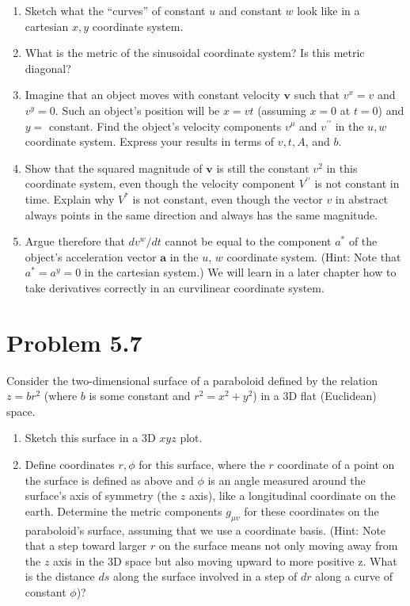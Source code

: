 \documentclass[12pt]{article}
\begin{document}
\begin{enumerate}
      \item Sketch what the ``curves'' of constant \(u\) and constant \(w\) look like in a cartesian \(x, y\) coordinate system.
      \item What is the metric of the sinusoidal coordinate system? Is this metric diagonal?
      \item Imagine that an object moves with constant velocity \(\boldsymbol{v}\) such that \(v^x=v\) and \(v^y=0\). Such an object's position will be \(x=v t\) (assuming \(x=0\) at \(t=0\)) and \(y=\) constant. Find the object's velocity components \(v^\mu \) and \(v^{\prime \prime}\) in the \(u, w\) coordinate system. Express your results in terms of \(v, t, A\), and \(b\).
      \item Show that the squared magnitude of \(\boldsymbol{v}\) is still the constant \(v^2\) in this coordinate system, even though the velocity component \(V^{\prime \prime}\) is not constant in time. Explain why \(V^*\) is not constant, even though the vector \(v\) in abstract always points in the same direction and always has the same magnitude.
      \item Argue therefore that \(d v^w / d t\) cannot be equal to the component \(a^*\) of the object's acceleration vector \(\boldsymbol{a}\) in the \(u\), \(w\) coordinate system. (Hint: Note that \(a^*=a^y=0\) in the cartesian system.) We will learn in a later chapter how to take derivatives correctly in an curvilinear coordinate system.
\end{enumerate}

\newpage

\section{Problem 5.7}

Consider the two-dimensional surface of a paraboloid defined by the relation \(z=b r^2\) (where \(b\) is some constant and \(r^2=x^2+y^2\)) in a 3D flat (Euclidean) space.

\begin{enumerate}
      \item Sketch this surface in a 3D \(x y z\) plot.
      \item Define coordinates \(r, \phi \) for this surface, where the \(r\) coordinate of a point on the surface is defined as above and \(\phi \) is an angle measured around the surface's axis of symmetry (the \(z\) axis), like a longitudinal coordinate on the earth. Determine the metric components \(g_{\mu v}\) for these coordinates on the paraboloid's surface, assuming that we use a coordinate basis. (Hint: Note that a step toward larger \(r\) on the surface means not only moving away from the \(z\) axis in the 3D space but also moving upward to more positive z. What is the distance \(d s\) along the surface involved in a step of \(d r\) along a curve of constant \(\phi \))? 
\end{enumerate}

\newpage



\nocite{El-Deeb_PEU-453_Assignments}
\end{document}
